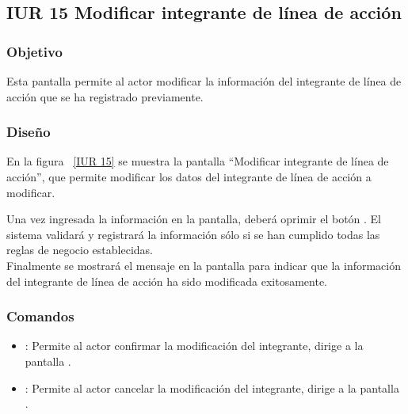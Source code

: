 \subsection{IUR 15 Modificar integrante de línea de acción}

\subsubsection{Objetivo}

	
	 Esta pantalla permite al actor  modificar la información del integrante de línea de acción que se ha registrado previamente.


\subsubsection{Diseño}

En la figura ~\ref{IUR 15} se muestra la pantalla ``Modificar integrante de línea de acción'', que permite modificar  los datos del integrante de línea de acción a modificar.
    
    Una vez ingresada la información en la pantalla, deberá oprimir el botón .
    El sistema validará y registrará la información sólo si se han cumplido todas las reglas de negocio establecidas.  \\
    
    Finalmente se mostrará el mensaje  en 
    la pantalla  para indicar que la información del integrante de línea de acción ha sido modificada exitosamente.
    



\subsubsection{Comandos}
    \begin{itemize}
	\item {}: Permite al actor confirmar la modificación del integrante, dirige a la pantalla .
	\item {}: Permite al actor cancelar la modificación del integrante, dirige a la pantalla .
    \end{itemize}

